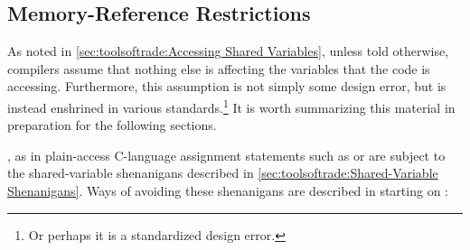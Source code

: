 \subsection{Memory-Reference Restrictions}
\label{sec:memorder:Memory-Reference Restrictions}

As noted in \cref{sec:toolsoftrade:Accessing Shared Variables},
unless told otherwise, compilers assume that nothing else
is affecting the variables that the code is accessing.
Furthermore, this assumption is not simply some design error, but is
instead enshrined in various standards.\footnote{
	Or perhaps it is a standardized design error.}
It is worth summarizing this material in preparation for the following
sections.

, as in plain-access C-language assignment statements such
as  or  are subject to the
shared-variable shenanigans described in
\cref{sec:toolsoftrade:Shared-Variable Shenanigans}.
Ways of avoiding these shenanigans are described in
starting on
:

